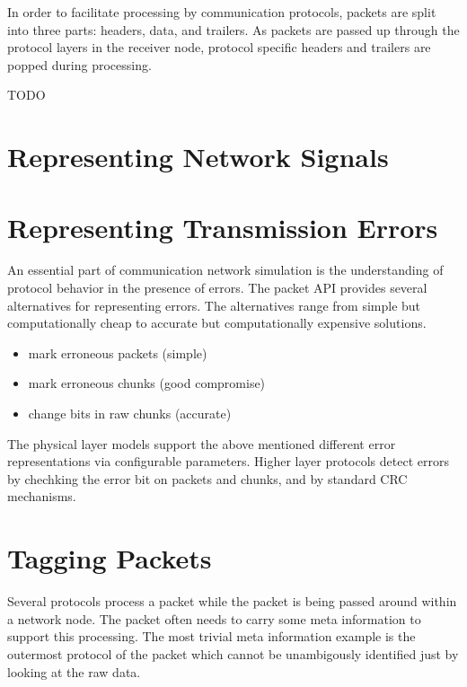 
In order to facilitate processing by communication protocols, packets are
split into three parts: headers, data, and trailers. As packets are passed
up through the protocol layers in the receiver node, protocol specific
headers and trailers are popped during processing.


\ifdraft TODO
\section{Representing Network Signals}

\fi


\section{Representing Transmission Errors}

An essential part of communication network simulation is the understanding
of protocol behavior in the presence of errors. The packet API provides
several alternatives for representing errors. The alternatives range from
simple but computationally cheap to accurate but computationally expensive
solutions.

\begin{itemize}
    \item   mark erroneous packets (simple)
    \item   mark erroneous chunks (good compromise)
    \item   change bits in raw chunks (accurate)
\end{itemize}


The physical layer models support the above mentioned different error
representations via configurable parameters. Higher layer protocols detect
errors by chechking the error bit on packets and chunks, and by standard
CRC mechanisms.

\section{Tagging Packets}

Several protocols process a packet while the packet is being passed around
within a network node. The packet often needs to carry some meta
information to support this processing. The most trivial meta information
example is the outermost protocol of the packet which cannot be
unambigously identified just by looking at the raw data.

